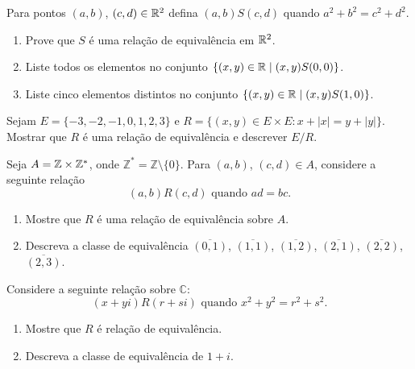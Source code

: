 \documentclass[12pt]{exam}
\begin{document}
\vspace{.3cm}

\questao{} Para pontos $(a, b)$, $(c, d) \in \mathbb{R}^2$ defina $(a, b) S (c, d)$ quando $a^2 + b^2 = c^2 + d^2$.
\begin{enumerate}[label={\alph*})]
  \item Prove que $S$ \'e uma rela\c{c}\~ao de equival\^encia em $\mathbb{R}^2$.
  \item Liste todos os elementos no conjunto $\{(x, y) \in \mathbb{R} \mid (x, y) S (0, 0)\}$.
  \item Liste cinco elementos distintos no conjunto $\{(x, y) \in \mathbb{R} \mid (x, y) S (1, 0)\}$.
\end{enumerate}

\vspace{.3cm}

\questao{} Sejam $E = \{-3, -2, -1, 0, 1, 2, 3\}$ e $R = \{(x, y) \in E \times E : x + |x| = y + |y|\}$. Mostrar que $R$ \'e uma rela\c{c}\~ao de equival\^encia e descrever $E/R$.

\vspace{.3cm}

\questao{} Seja $A = \mathbb{Z} \times \mathbb{Z}^*$, onde $\mathbb{Z}^* = \mathbb{Z} \setminus \{0\}$. Para $(a,b)$, $(c,d) \in A$, considere a seguinte rela{\c c}{\~a}o
\[
    (a,b) R (c,d) \mbox{ quando } ad = bc.
\]
\begin{enumerate}[label={\alph*})]
    \item Mostre que $R$ {\'e} uma rela{\c c}{\~a}o de equival{\^e}ncia sobre $A$.
    \item Descreva a classe de equival{\^e}ncia $\overline{(0,1)}$, $\overline{(1,1)}$, $\overline{(1,2)}$, $\overline{(2,1)}$, $\overline{(2,2)}$, $\overline{(2,3)}$.
\end{enumerate}

\vspace{.3cm}



\vspace{.3cm}

\questao{} Considere a seguinte rela{\c c}{\~a}o sobre $\mathbb{C}$:
\[
    (x+yi) R (r+si) \mbox{ quando } x^2+y^2=r^2+s^2.
\]
\begin{enumerate}[label={\alph*})]
    \item Mostre que $R$ {\'e} rela{\c c}{\~a}o de equival{\^e}ncia.
    \item Descreva a classe de equival{\^e}ncia de $1+i$.
\end{enumerate}
\end{document}

